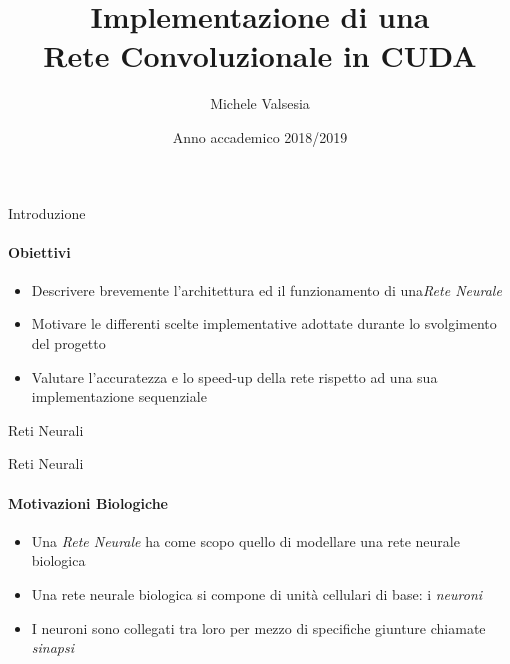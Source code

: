 \documentclass[
 ]{beamer}
\title{Implementazione di una \\ 
       Rete Convoluzionale in CUDA 
       \texorpdfstring{\bigskip}{Lg}
      }
\author{\hspace*{0.01em} {\Large Michele Valsesia} 
                         \texorpdfstring{\\ \bigskip}{Lg}
        \hspace*{-0.11em}{\Large Nicholas Aspes}
       }
\date{\Large Anno accademico 2018/2019}
\begin{document}
\maketitle



\begin{frame}{Introduzione}
    \framesubtitle{Obiettivi}  
    
    \begin{itemize} [<+->]
        \setlength\itemsep{2em}
        \item \large Descrivere brevemente l'architettura ed il funzionamento di una\emph{Rete Neurale}
        \item \large Motivare le differenti scelte implementative adottate durante lo svolgimento del progetto
        \item \large Valutare l'accuratezza e lo speed-up della rete rispetto ad una sua implementazione sequenziale       
    \end{itemize}  
\end{frame}



\begin{frame}[c]
  \centering
  \bigskip \bigskip    
  \Huge Reti Neurali
\end{frame}

\begin{frame}{Reti Neurali}
    \framesubtitle{Motivazioni Biologiche}
    \begin{itemize} [<+->]
        \setlength\itemsep{2em}
        \item \large Una \emph{Rete Neurale} ha come scopo quello di modellare una rete neurale biologica
       \item \large Una rete neurale biologica si compone di unità cellulari di base: i \emph{neuroni}
       \item \large I neuroni sono collegati tra loro per mezzo di specifiche giunture chiamate \emph{sinapsi}
    \end{itemize}
\end{frame} 
\end{document}

